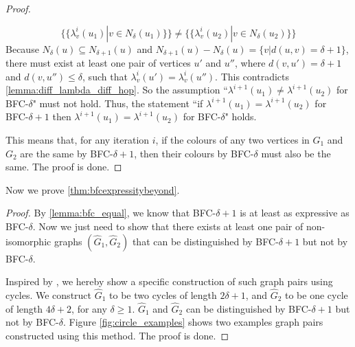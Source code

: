 \begin{proof}
\begin{itemize}
\begin{equation}
    \end{equation}
    \begin{equation}
        \label{eqn:color_multiset_delta}
        \{\!\!\{\lambda^{i}_{v}(u_1)| v\in N_{\delta}(u_1)\}\!\!\}  \neq  \{\!\!\{\lambda^{i}_{v}(u_2)| v\in N_{\delta}(u_2)\}\!\!\}
    \end{equation}
    Because $N_{\delta}(u) \subseteq N_{\delta+1}(u)$ and $N_{\delta+1}(u) - N_{\delta}(u) = \{v|d(u,v)=\delta+1\}$, 
    there must exist at least one pair of vertices $u'$ and $u''$, where $d(v,u')=\delta+1$ and $d(v,u'')\leq\delta$, such that $\lambda^{i}_v(u')=\lambda^{i}_v(u'')$.
    This contradicts \cref{lemma:diff_lambda_diff_hop}. So the assumption ``$\lambda^{i+1}(u_1) \neq \lambda^{i+1}(u_2)$ for BFC-$\delta$" must not hold. Thus, the statement ``if $\lambda^{i+1}(u_1) = \lambda^{i+1}(u_2)$ for BFC-$\delta+1$ then $\lambda^{i+1}(u_1) = \lambda^{i+1}(u_2)$ for BFC-$\delta$" holds.
\end{itemize}
This means that, for any iteration $i$, if the colours of any two vertices in $G_1$ and $G_2$ are the same by BFC-$\delta+1$, then their colours by BFC-$\delta$ must also be the same.
The proof is done.
\end{proof}

Now we prove \cref{thm:bfcexpressitybeyond}.
\bfcexpressitybeyond*
\begin{proof}
By \cref{lemma:bfc_equal}, we know that BFC-$\delta+1$ is at least as expressive as BFC-$\delta$. Now we just need to show that there exists at least one pair of non-isomorphic graphs $(\hat{G}_1, \hat{G}_2)$ that can be distinguished by BFC-$\delta+1$ but not by BFC-$\delta$.

Inspired by \citet{wang2023mathscrnwl}, we hereby show a specific construction of such graph pairs using cycles. We construct $\hat{G}_1$ to be two cycles of length $2\delta+1$, and $\hat{G}_2$ to be one cycle of length $4\delta+2$, for any $\delta\geq 1$. $\hat{G}_1$ and $\hat{G}_2$ can be distinguished by BFC-$\delta+1$ but not by BFC-$\delta$. Figure \ref{fig:circle_examples} shows two examples graph pairs constructed using this method. The proof is done.
\end{proof}





